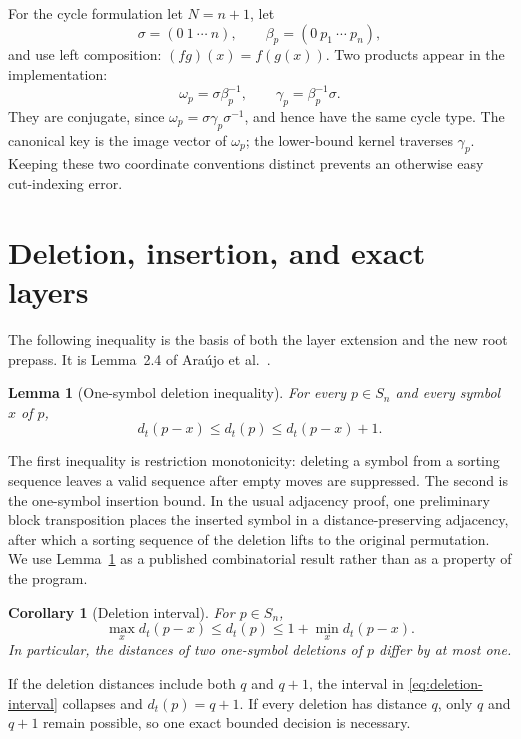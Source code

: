 \documentclass[11pt]{article}
\newtheorem{lemma}[theorem]{Lemma}
\newtheorem{corollary}[theorem]{Corollary}
\theoremstyle{definition}
\theoremstyle{remark}
\newcommand{\dist}{d_t}
\begin{document}
For the cycle formulation let $N=n+1$, let
\[
  \sigma=(0\ 1\ \cdots\ n),\qquad
  \beta_p=(0\ p_1\ \cdots\ p_n),
\]
and use left composition: $(fg)(x)=f(g(x))$.  Two products appear in the
implementation:
\[
  \omega_p=\sigma\beta_p^{-1},
  \qquad
  \gamma_p=\beta_p^{-1}\sigma.
\]
They are conjugate, since $\omega_p=\sigma\gamma_p\sigma^{-1}$, and hence
have the same cycle type.  The canonical key is the image vector of
$\omega_p$; the lower-bound kernel traverses $\gamma_p$.  Keeping these two
coordinate conventions distinct prevents an otherwise easy cut-indexing
error.

\section{Deletion, insertion, and exact layers}
\label{sec:deletion}

The following inequality is the basis of both the layer extension and the
new root prepass.  It is Lemma~2.4 of Ara\'ujo et
al.~\cite{AraujoEtAl2026}.

\begin{lemma}[One-symbol deletion inequality]
\label{lem:deletion}
For every $p\in S_n$ and every symbol $x$ of $p$,
\[
  \dist(p-x)\leq\dist(p)\leq\dist(p-x)+1.       \tag{3.1}
\]
\end{lemma}

The first inequality is restriction monotonicity: deleting a symbol from a
sorting sequence leaves a valid sequence after empty moves are suppressed.
The second is the one-symbol insertion bound.  In the usual adjacency proof,
one preliminary block transposition places the inserted symbol in a
distance-preserving adjacency, after which a sorting sequence of the deletion
lifts to the original permutation.  We use Lemma~\ref{lem:deletion} as a
published combinatorial result rather than as a property of the program.

\begin{corollary}[Deletion interval]
\label{cor:interval}
For $p\in S_n$,
\[
  \max_x\dist(p-x)\leq\dist(p)
  \leq 1+\min_x\dist(p-x).                      \tag{3.2}\label{eq:deletion-interval}
\]
In particular, the distances of two one-symbol deletions of $p$ differ by at
most one.
\end{corollary}

If the deletion distances include both $q$ and $q+1$, the interval in
\eqref{eq:deletion-interval} collapses and $\dist(p)=q+1$.  If every deletion has distance
$q$, only $q$ and $q+1$ remain possible, so one exact bounded decision is
necessary.
\end{document}
